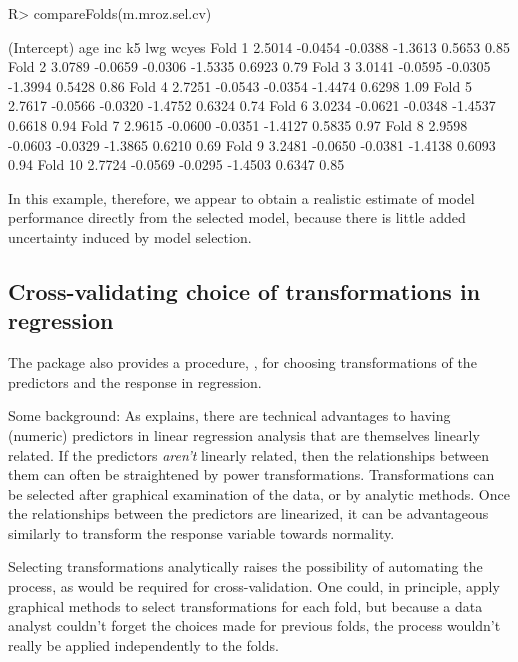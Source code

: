 \documentclass[
]{jss}
\begin{document}
\begin{CodeChunk}
\begin{CodeInput}
R> compareFolds(m.mroz.sel.cv)
\end{CodeInput}
\begin{CodeOutput}
        (Intercept)     age     inc      k5     lwg wcyes
Fold 1       2.5014 -0.0454 -0.0388 -1.3613  0.5653  0.85
Fold 2       3.0789 -0.0659 -0.0306 -1.5335  0.6923  0.79
Fold 3       3.0141 -0.0595 -0.0305 -1.3994  0.5428  0.86
Fold 4       2.7251 -0.0543 -0.0354 -1.4474  0.6298  1.09
Fold 5       2.7617 -0.0566 -0.0320 -1.4752  0.6324  0.74
Fold 6       3.0234 -0.0621 -0.0348 -1.4537  0.6618  0.94
Fold 7       2.9615 -0.0600 -0.0351 -1.4127  0.5835  0.97
Fold 8       2.9598 -0.0603 -0.0329 -1.3865  0.6210  0.69
Fold 9       3.2481 -0.0650 -0.0381 -1.4138  0.6093  0.94
Fold 10      2.7724 -0.0569 -0.0295 -1.4503  0.6347  0.85
\end{CodeOutput}
\end{CodeChunk}

In this example, therefore, we appear to obtain a realistic estimate of
model performance directly from the selected model, because there is
little added uncertainty induced by model selection.

\hypertarget{cross-validating-choice-of-transformations-in-regression}{%
\subsection{Cross-validating choice of transformations in
regression}\label{cross-validating-choice-of-transformations-in-regression}}

The  package also provides a  procedure,
, for choosing transformations of the predictors and
the response in regression.

Some background: As \citet[Sec. 8.2]{Weisberg:2014} explains, there are
technical advantages to having (numeric) predictors in linear regression
analysis that are themselves linearly related. If the predictors
\emph{aren't} linearly related, then the relationships between them can
often be straightened by power transformations. Transformations can be
selected after graphical examination of the data, or by analytic
methods. Once the relationships between the predictors are linearized,
it can be advantageous similarly to transform the response variable
towards normality.

Selecting transformations analytically raises the possibility of
automating the process, as would be required for cross-validation. One
could, in principle, apply graphical methods to select transformations
for each fold, but because a data analyst couldn't forget the choices
made for previous folds, the process wouldn't really be applied
independently to the folds.
\end{document}
